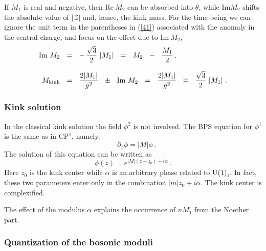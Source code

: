 \documentclass[epsfig,12pt]{article}
\def\beq{\begin{equation}}
\def\eeq{\end{equation}}
\def\beq{\begin{equation}}
\def\eeq{\end{equation}}
\newcommand{\mc}[1]{\mathcal{#1}}
\begin{document}
If $M_1$ is real and negative, then Re$~M_2$  can be absorbed into $\theta$, while Im$M_2$ shifts
the absolute value of $|\mc{Z}|$ and, hence, the kink mass. For the time 
being we can ignore the unit term in the parentheses in (\ref{41}) associated with the anomaly in the central charge,
and focus on the effect due to  Im$~M_2$,
\begin{align}
	{\rm Im}~M_2 
	& ~~=~~
	-\, \frac{\sqrt 3}{2}\, \left|M_1\right| ~~=~~ M_2 ~~-~~ \frac{M_1}{2}\,,
 \nonumber\\[3mm]
	 M_{\rm kink} 
	 &~~=~~
	 \frac{2|M_1|}{g^2} ~~\pm~~ {\rm Im}~M_2 ~~=~~ 
	 \frac{2|M_1|}{g^2} ~~\mp~~ \frac{\sqrt 3}{2}\,\left|M_1\right| \,.
\end{align}


\subsubsection{Kink solution}

In the classical kink solution the field $\phi^2$ is not involved. The BPS equation for $\phi^1$ is the same as in CP$^1$, namely,
\beq
\quad \partial_z \phi = |M| \phi\,.
\label{13twentysix}
\eeq
The solution of this equation  can be written as
\beq
\phi (z) = e^{|M|(z-z_0) -i\alpha}\,.
\label{13twentyseven}
\eeq
Here $z_0$ is the kink center while $\alpha$ is an arbitrary phase related to U(1)$_1$.
In fact, these two parameters enter only in the combination
$|m| z_0 +i\alpha$. The kink center 
is complexified. 

The effect of the modulus $\alpha$ explains the occurrence of 
$nM_1$ from the Noether part.



\subsubsection{Quantization of the bosonic moduli}
\end{document}
